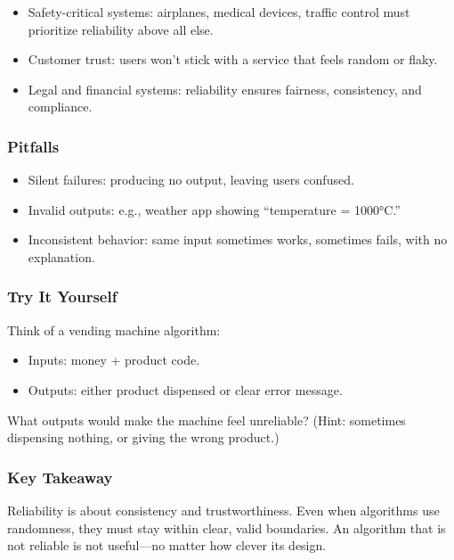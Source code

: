 \documentclass[
  letterpaper,
  DIV=11,
  numbers=noendperiod]{scrreprt}
\providecommand{\tightlist}{%
  \setlength{\itemsep}{0pt}\setlength{\parskip}{0pt}}
\begin{document}
\begin{itemize}
\tightlist
\item
  Safety-critical systems: airplanes, medical devices, traffic control
  must prioritize reliability above all else.
\item
  Customer trust: users won't stick with a service that feels random or
  flaky.
\item
  Legal and financial systems: reliability ensures fairness,
  consistency, and compliance.
\end{itemize}

\subsubsection{Pitfalls}\label{pitfalls-24}

\begin{itemize}
\tightlist
\item
  Silent failures: producing no output, leaving users confused.
\item
  Invalid outputs: e.g., weather app showing ``temperature = 1000°C.''
\item
  Inconsistent behavior: same input sometimes works, sometimes fails,
  with no explanation.
\end{itemize}

\subsubsection{Try It Yourself}\label{try-it-yourself-27}

Think of a vending machine algorithm:

\begin{itemize}
\tightlist
\item
  Inputs: money + product code.
\item
  Outputs: either product dispensed or clear error message.
\end{itemize}

What outputs would make the machine feel unreliable? (Hint: sometimes
dispensing nothing, or giving the wrong product.)

\subsubsection{Key Takeaway}\label{key-takeaway-26}

Reliability is about consistency and trustworthiness. Even when
algorithms use randomness, they must stay within clear, valid
boundaries. An algorithm that is not reliable is not useful---no matter
how clever its design.
\end{document}
